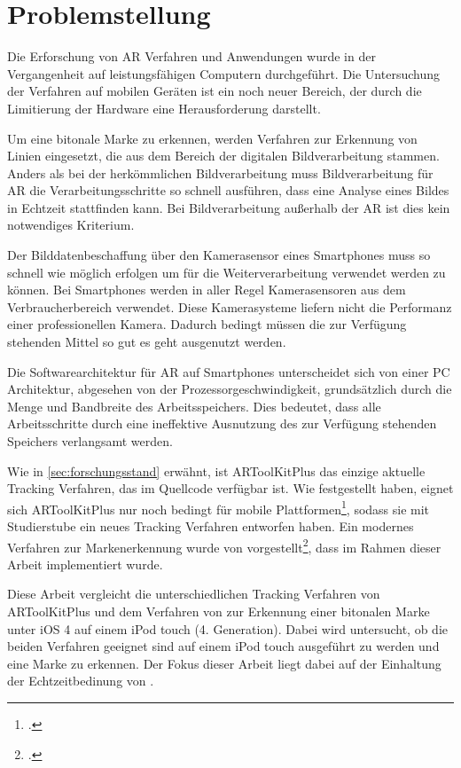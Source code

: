 \section{Problemstellung} %
\label{sec:problemstellung}
\begin{comment}
	Problemstellung: Problemstellung und Frage im Detail erläutern
\end{comment}

Die Erforschung von \gls{AR} Verfahren und Anwendungen wurde in der Vergangenheit auf leistungsfähigen Computern
 durchgeführt. Die Untersuchung der Verfahren auf mobilen Geräten ist ein noch neuer Bereich, der durch die Limitierung
 der Hardware eine Herausforderung darstellt.

Um eine bitonale Marke zu erkennen, werden Verfahren zur Erkennung von Linien eingesetzt, die aus dem Bereich der
 digitalen Bildverarbeitung stammen. Anders als bei der herkömmlichen Bildverarbeitung muss Bildverarbeitung für
 \gls{AR} die Verarbeitungsschritte so schnell ausführen, dass eine Analyse eines Bildes in Echtzeit stattfinden kann.
 Bei Bildverarbeitung außerhalb der \gls{AR} ist dies kein notwendiges Kriterium.

Der Bilddatenbeschaffung über den Kamerasensor eines Smartphones muss so schnell wie möglich erfolgen um für die
 Weiterverarbeitung verwendet werden zu können. Bei Smartphones werden in aller Regel Kamerasensoren aus dem
 Verbraucherbereich verwendet. Diese Kamerasysteme liefern nicht die Performanz einer professionellen Kamera. Dadurch
 bedingt müssen die zur Verfügung stehenden Mittel so gut es geht ausgenutzt werden.

Die Softwarearchitektur für \gls{AR} auf Smartphones unterscheidet sich von einer PC Architektur, abgesehen von der
 Prozessorgeschwindigkeit, grundsätzlich durch die Menge und Bandbreite des Arbeitsspeichers. Dies bedeutet, dass alle
 Arbeitsschritte durch eine ineffektive Ausnutzung des zur Verfügung stehenden Speichers verlangsamt werden.

Wie in \autoref{sec:forschungsstand} erwähnt, ist ARToolKitPlus das einzige aktuelle Tracking Verfahren, das im
 Quellcode verfügbar ist. Wie \citeauthor{wagner09a} festgestellt haben, eignet sich ARToolKitPlus nur noch bedingt für
 mobile Plattformen\footcite{wagner09a}, sodass sie mit Studierstube ein neues Tracking Verfahren entworfen haben. Ein
 modernes Verfahren zur Markenerkennung wurde von \citeauthor{hirzer08} vorgestellt\footcite{hirzer08}, dass im Rahmen
 dieser Arbeit implementiert wurde.

Diese Arbeit vergleicht die unterschiedlichen Tracking Verfahren von ARToolKitPlus und dem Verfahren von
 \citeauthor{hirzer08} zur Erkennung einer bitonalen Marke unter iOS 4 auf einem iPod touch (4. Generation). Dabei wird
 untersucht, ob die beiden Verfahren geeignet sind auf einem iPod touch ausgeführt zu werden und eine Marke zu
 erkennen. Der Fokus dieser Arbeit liegt dabei auf der Einhaltung der Echtzeitbedinung von \citeauthor{azuma97}.

